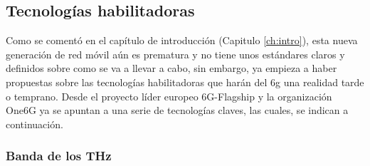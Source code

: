 \subsection{Tecnologías habilitadoras}

Como se comentó en el capítulo de introducción (Capitulo \ref{ch:intro}), esta nueva generación de red móvil aún es prematura y no tiene unos estándares claros y definidos sobre como se va a llevar a cabo, sin embargo, ya empieza a haber propuestas sobre las tecnologías habilitadoras que harán del \gls{6g} una realidad tarde o temprano. Desde el proyecto líder europeo  6G-Flagship\cite{9482430} y la organización One6G \cite{paoloni2022one6g} ya se apuntan a una serie de tecnologías claves, las cuales, se indican a continuación.

\subsubsection{Banda de los THz}

